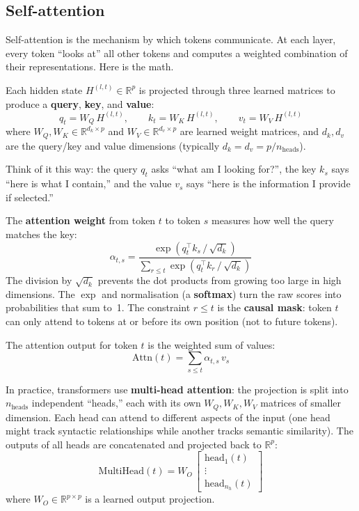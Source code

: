 \documentclass[11pt, twoside, openright]{memoir}
\numberwithin{equation}{chapter}
\begin{document}
\subsection*{Self-attention}
\label{sec:self-attention}

Self-attention is the mechanism by which tokens communicate.  At each
layer, every token ``looks at'' all other tokens and computes a
weighted combination of their representations.  Here is the math.

Each hidden state $H^{(l,t)} \in \mathbb{R}^p$ is projected through
three learned matrices to produce a \textbf{query}, \textbf{key}, and
\textbf{value}:
\begin{equation}
  q_t = W_Q \, H^{(l,t)}, \qquad
  k_t = W_K \, H^{(l,t)}, \qquad
  v_t = W_V \, H^{(l,t)}
\end{equation}
where $W_Q, W_K \in \mathbb{R}^{d_k \times p}$ and
$W_V \in \mathbb{R}^{d_v \times p}$ are learned weight matrices, and
$d_k, d_v$ are the query/key and value dimensions
(typically $d_k = d_v = p / n_{\text{heads}}$).

Think of it this way: the query $q_t$ asks ``what am I looking for?'',
the key $k_s$ says ``here is what I contain,'' and the value $v_s$ says
``here is the information I provide if selected.''

The \textbf{attention weight} from token $t$ to token $s$ measures how
well the query matches the key:
\begin{equation}
  \alpha_{t,s} = \frac{\exp(q_t^\top k_s \,/\, \sqrt{d_k})}
                      {\sum_{r \le t} \exp(q_t^\top k_r \,/\, \sqrt{d_k})}
\end{equation}
The division by $\sqrt{d_k}$ prevents the dot products from growing too
large in high dimensions.  The $\exp$ and normalisation (a
\textbf{softmax}) turn the raw scores into probabilities that sum to~1.
The constraint $r \le t$ is the \textbf{causal mask}: token $t$ can
only attend to tokens at or before its own position (not to future
tokens).

The attention output for token $t$ is the weighted sum of values:
\begin{equation}
  \mathrm{Attn}(t) = \sum_{s \le t} \alpha_{t,s} \, v_s
\end{equation}

In practice, transformers use \textbf{multi-head attention}: the
projection is split into $n_{\text{heads}}$ independent ``heads,'' each
with its own $W_Q, W_K, W_V$ matrices of smaller dimension.  Each head
can attend to different aspects of the input (one head might track
syntactic relationships while another tracks semantic similarity).
The outputs of all heads are concatenated and projected back to
$\mathbb{R}^p$:
\begin{equation}
  \mathrm{MultiHead}(t) = W_O \,
    \begin{bmatrix} \mathrm{head}_1(t) \\ \vdots \\ \mathrm{head}_{n_h}(t) \end{bmatrix}
\end{equation}
where $W_O \in \mathbb{R}^{p \times p}$ is a learned output projection.
\end{document}
